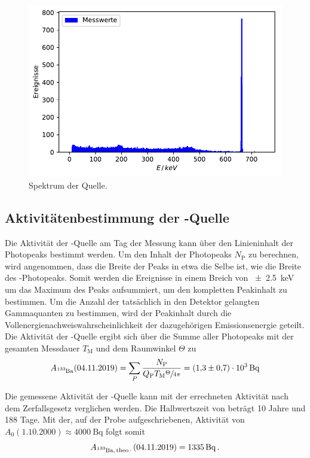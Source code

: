 \begin{figure}[H]
  \centering
  \includegraphics[width=.7\textwidth]{../Plots/Cs_Spektrum.pdf}
  \caption{Spektrum der  Quelle.}
  \label{fig:Cs_Spektrum}
\end{figure}


\subsection{Aktivitätenbestimmung der -Quelle} \label{sec:Ba}

Die Aktivität der -Quelle am Tag der Messung kann über den Linieninhalt der Photopeaks bestimmt werden.
Um den Inhalt der Photopeaks $N_\text{P}$ zu berechnen, wird angenommen, dass die Breite der Peaks in etwa die Selbe ist, wie die Breite des -Photopeaks.
Somit werden die Ereignisse in einem Breich von \SI{\pm2.5}{\kilo\electronvolt} um das Maximum des Peaks aufsummiert, um den kompletten Peakinhalt zu bestimmen.
Um die Anzahl der tatsächlich in den Detektor gelangten Gammaquanten zu bestimmen, wird der Peakinhalt durch die Vollenergienachweiswahrscheinlichkeit der dazugehörigen Emissionsenergie geteilt.
Die Aktivität der -Quelle ergibt sich über die Summe aller Photopeaks mit der gesamten Messdauer $T_\text{M}$ und dem Raumwinkel $\Theta$ zu
\begin{equation}
  A_\text{\ce{^133Ba}}(04.11.2019) = \sum_{P} \frac{N_\text{P}}{Q_\text{P} T_\text{M} \sfrac{\Theta}{4\pi}} = \SI{1.3(7)e3}{\becquerel}
  \label{eqn:Act_Ba}
\end{equation}

Die gemessene Aktivität der -Quelle kann mit der errechneten Aktivität nach dem Zerfallsgesetz verglichen werden.
Die Halbwertszeit von  beträgt 10 Jahre und 188 Tage. Mit der, auf der Probe aufgeschriebenen, Aktivität von  $A_0(1.10.2000) \approx \SI{4000}{\becquerel}$ folgt somit
\begin{equation*}
  A_\text{\ce{^133Ba,theo.}}(04.11.2019) = \SI{1335}{\becquerel} \, .
\end{equation*}

